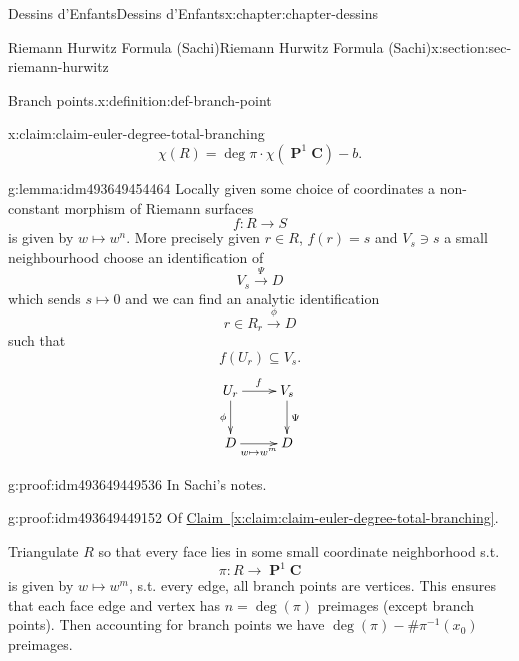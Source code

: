 \documentclass[oneside,10pt,]{book}
\numberwithin{equation}{section}
\newcommand{\inv}{^{-1}}
\newcommand{\CC}{\mathbf{C}}
\DeclareMathOperator{\PP}{\mathbf{P}}
\begin{document}
\begin{chapterptx}{Dessins d'Enfants}{}{Dessins d'Enfants}{}{}{x:chapter:chapter-dessins}
\begin{sectionptx}{Riemann Hurwitz Formula (Sachi)}{}{Riemann Hurwitz Formula (Sachi)}{}{}{x:section:sec-riemann-hurwitz}
\begin{definition}{Branch points.}{x:definition:def-branch-point}
\begin{equation*}
\end{equation*}
%
\end{definition}
\begin{claim}{}{}{x:claim:claim-euler-degree-total-branching}%
%
\begin{equation*}
\chi(R) = \deg \pi \cdot \chi(\PP^1\CC)  - b\text{.}
\end{equation*}
%
\end{claim}
\begin{lemma}{}{}{g:lemma:idm493649454464}%
Locally given some choice of coordinates a non-constant morphism of Riemann surfaces%
\begin{equation*}
f\colon R \to S
\end{equation*}
is given by \(w\mapsto w^n\). More precisely given \(r \in R\), \(f(r) = s\) and \(V_s \ni s\) a small neighbourhood choose an identification of%
\begin{equation*}
V_s \xrightarrow \Psi D
\end{equation*}
which sends \(s \mapsto 0\) and we can find an analytic identification%
\begin{equation*}
r\in R_r \xrightarrow \phi D
\end{equation*}
such that%
\begin{equation*}
f(U_r) \subseteq V_s\text{.}
\end{equation*}
%
\begin{equation*}
\xymatrix{U_r \ar[r]^f \ar[d]_\phi & V_s \ar[d]^\Psi \\ D \ar[r]_{w\mapsto w^m} & D}
\end{equation*}
%
\end{lemma}
\begin{proofptx}{}{g:proof:idm493649449536}
In Sachi's notes.%
\end{proofptx}
\begin{proofptx}{}{g:proof:idm493649449152}
Of \hyperref[x:claim:claim-euler-degree-total-branching]{Claim~\ref{x:claim:claim-euler-degree-total-branching}}.%
\par
Triangulate \(R\) so that every face lies in some small coordinate neighborhood s.t.%
\begin{equation*}
\pi \colon R\to \PP^1 \CC
\end{equation*}
is given by \(w \mapsto w^m\), s.t. every edge, all branch points are vertices. This ensures that each face edge and vertex has \(n  = \deg (\pi)\) preimages (except branch points). Then accounting for branch points we have \(\deg(\pi) -  \# \pi\inv (x_0)\) preimages.%
\end{proofptx}

\end{sectionptx}
\end{chapterptx}
\end{document}
